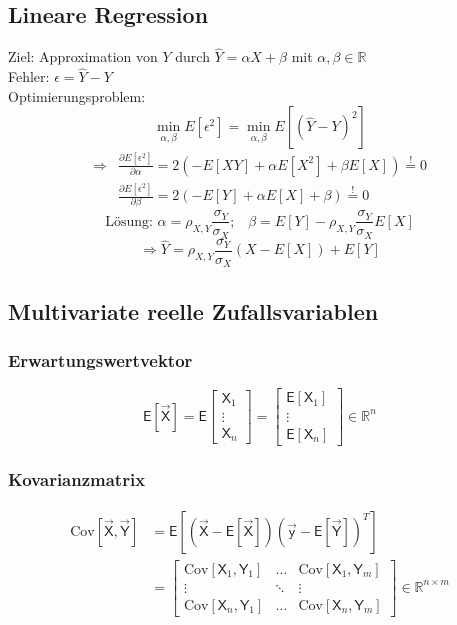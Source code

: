 \documentclass[a4paper,twocolumn,10pt]{article}
\newcommand{\sollsein}{\stackrel{!}{=}}
\newcommand{\erw}{\mathsf{E}}
\begin{document}
\subsection{Lineare Regression}
Ziel: Approximation von $Y$ durch $\hat{Y}=\alpha X+\beta$ mit $\alpha,\beta\in\mathbb{R}$\\
Fehler: $\epsilon=\hat{Y}-Y$\\
Optimierungsproblem:
\[\min\limits_{\alpha,\beta}E[\epsilon^2]=\min\limits_{\alpha,\beta}E\left[\left(\hat{Y}-Y\right)^2\right]\]
\[\begin{split}\Rightarrow &\frac{\partial E[\epsilon^2]}{\partial\alpha}=2(-E[XY]+\alpha E[X^2]+\beta E[X])\sollsein 0\\&\frac{\partial E[\epsilon^2]}{\partial\beta}=2(-E[Y]+\alpha E[X]+\beta)\sollsein 0\end{split}\]
\[\text{Lösung: }\alpha=\rho_{X,Y}\frac{\sigma_Y}{\sigma_X};\;\;\;\beta=E[Y]-\rho_{X,Y}\frac{\sigma_Y}{\sigma_X}E[X]\]
\[\Rightarrow \hat{Y}=\rho_{X,Y}\frac{\sigma_Y}{\sigma_X}(X-E[X])+E[Y]\]

\subsection{Multivariate reelle Zufallsvariablen}

\subsubsection{Erwartungswertvektor}
\[ \erw[\vec{\mathsf X}] = \erw\begin{bmatrix} \mathsf X_1 \\ \vdots \\ \mathsf X_n \end{bmatrix} = \begin{bmatrix} \erw[\mathsf X_1] \\ \vdots \\ \erw[\mathsf X_n] \end{bmatrix} \in \mathbb R^n\]

\subsubsection{Kovarianzmatrix}
\[ \begin{split} \text{Cov}[\vec{\mathsf X}, \vec{\mathsf Y}] & = \erw[(\vec{\mathsf X} - \erw[\vec{\mathsf X}])(\vec{\mathsf y} - \erw[\vec{\mathsf Y}])^T] \\ & = \begin{bmatrix} \text{Cov}[\mathsf X_1, \mathsf Y_1] & \dots & \text{Cov}[\mathsf X_1, \mathsf Y_m] \\ \vdots & \ddots & \vdots \\ \text{Cov}[\mathsf X_n, \mathsf Y_1] & \dots & \text{Cov}[\mathsf X_n, \mathsf Y_m] \end{bmatrix} \in \mathbb R^{n \times m} \end{split}\]
\end{document}
